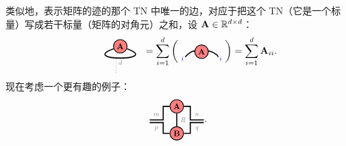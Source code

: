 类似地，表示矩阵的迹的那个 TN 中唯一的边，对应于把这个 TN（它是一个标量）写成若干标量（矩阵的对角元）之和，设 $\mathbf{A}\in\mathbb{R}^{d\times d}$：
$$\begin{tikzpicture}[baseline=\baseline]
    \tikzset{tensor/.style = {minimum size = 0.5cm,shape = circle,thick,draw=black,inner sep = 0pt}, edge/.style = {thick,line width=.4mm},every loop/.style={}}
    \def\y{0}
    \def\x{0}
    \node[tensor,fill=red!50!white] (A) at (\x,\y+0.2){\scalebox{0.85}{$\Ab$}};
    \draw[edge] (A) to [out=-20,in=-160, distance=1.35cm] (A);
    \draw[dotted] (\x-0.15,\y-0.1) -- (\x-0.15,\y-0.8);
    \node[draw=none] () at (\x,\y-0.4) {\scalebox{0.7}{\dimcolor{$d$}}};
\end{tikzpicture}\hspace{-0.7cm}
=
\sum_{i=1}^d\left(
\begin{tikzpicture}[baseline=\baseline]
    \tikzset{tensor/.style = {minimum size = 0.5cm,shape = circle,thick,draw=black,inner sep = 0pt}, edge/.style = {thick,line width=.4mm},every loop/.style={}}
    \def\y{0}
    \def\x{0}
    \node[tensor,fill=red!50!white] (A) at (\x,\y){\scalebox{0.85}{$\Ab$}};
     \draw[edge] (\x-0.25,\y) to [out=110,in=60, distance=0.1cm] (\x-0.6,\y-0.2);    
    \draw[edge] (\x+0.25,\y) to [out=110,in=60, distance=0.1cm] (\x+0.6,\y-0.2); 
    \node[draw=none] () at (\x+0.7,\y-0.25) {\scalebox{0.7}{\indcolor{$i$}}};
    \node[draw=none] () at (\x-0.7,\y-0.25) {\scalebox{0.7}{\indcolor{$i$}}};
    \end{tikzpicture}\right)=\sum_{i=1}^d\Ab_{ii}.
    $$
现在考虑一个更有趣的例子：
$$\begin{tikzpicture}[baseline=\baseline]
    \tikzset{tensor/.style = {minimum size = 0.5cm,shape = circle,thick,draw=black,inner sep = 0pt}, edge/.style = {thick,line width=.4mm},every loop/.style={}}
    \def\y{0}
    \def\x{0}
    \node[tensor,fill=red!50!white] (A) at (\x,\y+0.5){\scalebox{0.85}{$\Ab$}};
    \node[tensor,fill=red!50!white] (B) at (\x,\y-0.5){\scalebox{0.85}{$\Bb$}};
    \draw[edge](A)--(B)node [midway, right] {\scalebox{0.7}{\dimcolor{$R$}}};
    \draw[edge](A) -- (\x+0.5,\y+0.5)--(\x+0.5,\y)--(\x+1,\y)node [midway, above] {\scalebox{0.7}{\dimcolor{$n$}}};
    \draw[edge](A) -- (\x-0.5,\y+0.5)--(\x-0.5,\y)--(\x-1,\y)node [midway, above] {\scalebox{0.7}{\dimcolor{$m$}}};
    \draw[edge](B) -- (\x+0.5,\y-0.5)--(\x+0.5,\y-0.1)--(\x+1,\y-0.1)node [midway, below] {\scalebox{0.7}{\dimcolor{$q$}}};
    \draw[edge](B) -- (\x-0.5,\y-0.5)--(\x-0.5,\y-0.1)--(\x-1,\y-0.1)node [midway, below] {\scalebox{0.7}{\dimcolor{$p$}}};
    \end{tikzpicture}.$$
